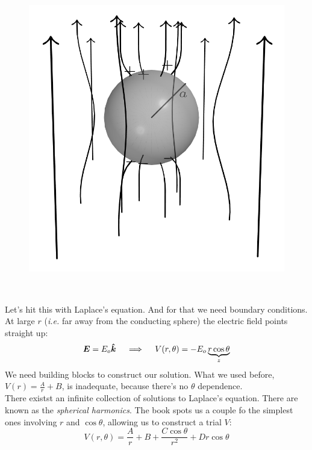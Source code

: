 \documentclass{article}
\begin{document}
\begin{minipage}{0.4\textwidth}
\begin{figure}[H]
\centering
    \includegraphics[width=\textwidth]{figures/6l4.png}
\end{figure}
\end{minipage}
~
\begin{minipage}{0.5\textwidth}
Let's hit this with Laplace's equation. And for that we need boundary conditions. At large $r$ (\textit{i.e.} far away from the conducting sphere) the electric field points straight up:
\begin{equation*}
    \bm{E} = E_o \bm{\hat{k}} \quad \implies \quad  V(r,\theta) = -E_o \underbrace{r\cos{\theta}}_{z}
\end{equation*}
We need building blocks to construct our solution. What we used before, $V(r) = \frac{A}{r} + B$, is inadequate, because there's no $\theta$ dependence. \\[1em]
There existst an infinite collection of solutions to Laplace's equation. There are known as the \emph{spherical harmonics}. The book spots us a couple fo the simplest ones involving $r$ and $\cos{\theta}$, allowing us to construct a trial $V$:
\begin{equation*}
    V(r,\theta) = \frac{A}{r} + B + \frac{C\cos{\theta}}{r^2} + D r\cos{\theta}
\end{equation*}
\end{minipage}
\end{document}

